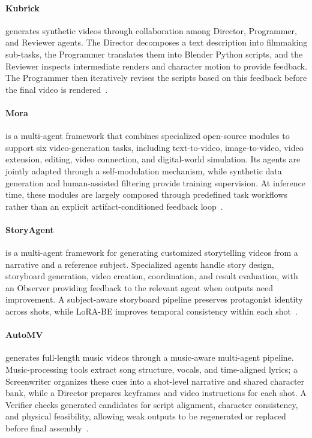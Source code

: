 \paragraph{Kubrick}
 generates synthetic videos through collaboration among Director, Programmer, and Reviewer agents. The Director decomposes a text description into filmmaking sub-tasks, the Programmer translates them into Blender Python scripts, and the Reviewer inspects intermediate renders and character motion to provide feedback. The Programmer then iteratively revises the scripts based on this feedback before the final video is rendered~\cite{he2024kubrick}.

\paragraph{Mora}
 is a multi-agent framework that combines specialized open-source modules to support six video-generation tasks, including text-to-video, image-to-video, video extension, editing, video connection, and digital-world simulation. Its agents are jointly adapted through a self-modulation mechanism, while synthetic data generation and human-assisted filtering provide training supervision. At inference time, these modules are largely composed through predefined task workflows rather than an explicit artifact-conditioned feedback loop~\cite{yuan2024mora}.

\paragraph{StoryAgent}
 is a multi-agent framework for generating customized storytelling videos from a narrative and a reference subject. Specialized agents handle story design, storyboard generation, video creation, coordination, and result evaluation, with an Observer providing feedback to the relevant agent when outputs need improvement. A subject-aware storyboard pipeline preserves protagonist identity across shots, while LoRA-BE improves temporal consistency within each shot~\cite{avg241104925}.

\paragraph{AutoMV}
 generates full-length music videos through a music-aware multi-agent pipeline. Music-processing tools extract song structure, vocals, and time-aligned lyrics; a Screenwriter organizes these cues into a shot-level narrative and shared character bank, while a Director prepares keyframes and video instructions for each shot. A Verifier checks generated candidates for script alignment, character consistency, and physical feasibility, allowing weak outputs to be regenerated or replaced before final assembly~\cite{avg251212196}.

